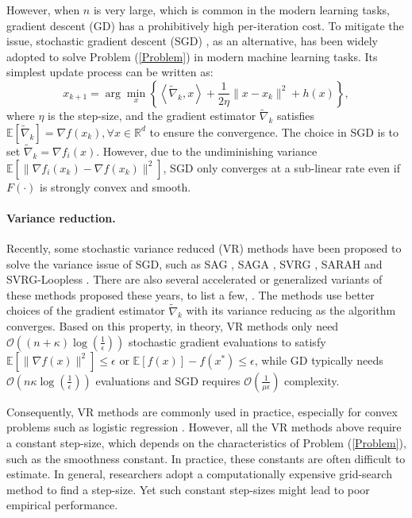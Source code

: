 \documentclass[letterpaper]{article} %
\begin{document}
However, when $n$ is very large, which is common in the modern learning tasks, gradient descent (GD) has a prohibitively high per-iteration cost.
%
%
To mitigate the issue, stochastic gradient descent (SGD) \citep{10.1214/aoms/1177729586, DBLP:journals/siamjo/NemirovskiJLS09}, as an alternative, has been widely adopted to solve Problem (\ref{Problem}) in modern machine learning tasks.
%
Its simplest update process can be written as:
\begin{equation*}
    x_{k+1} = \arg \min_x \left\{\left\langle \widetilde{\nabla}_k, x \right\rangle  + \frac{1}{2\eta}\|x-x_k\|^2+ h(x)\right\},
\end{equation*}
where $\eta$ is the step-size, and the gradient estimator $\widetilde{\nabla}_k$ satisfies $\mathbb{E}[\widetilde{\nabla}_k] = \nabla f(x_k), \forall x \in \mathbb{R}^d$ to ensure the convergence.
%
The choice in SGD is to set $\widetilde{\nabla}_k=\nabla f_i(x)$.
%
However, due to the undiminishing variance $\mathbb{E}[\|\nabla f_i(x_k) - \nabla f(x_k) \|^2]$, SGD only converges at a sub-linear rate even if $F(\cdot)$ is strongly convex and smooth.

\paragraph{Variance reduction.}
%
Recently, some stochastic variance reduced (VR) methods have been proposed to solve the variance issue of SGD, such as SAG \citep{DBLP:conf/nips/RouxSB12}, SAGA \citep{DBLP:conf/nips/DefazioBL14}, SVRG \citep{DBLP:conf/nips/Johnson013}, SARAH \citep{DBLP:conf/icml/NguyenLST17} and SVRG-Loopless \citep{DBLP:conf/alt/KovalevHR20}.
%
There are also several accelerated or generalized variants of these methods proposed these years, to list a few, \cite{DBLP:conf/nips/Defazio16,DBLP:journals/mp/GowerRB21,DBLP:journals/corr/abs-2006-11573,DBLP:conf/nips/ZhouSC20}.
%
The methods use better choices of the gradient estimator $\widetilde{\nabla}_k$ with its variance reducing as the algorithm converges.
%
Based on this property, in theory, VR methods only need $\mathcal{O}((n+\kappa)\log(\frac{1}{\epsilon}))$ stochastic gradient evaluations to satisfy $\mathbb{E}[\|\nabla f(x) \|^2] \leq \epsilon$ or $\mathbb{E}[f(x)] - f(x^*) \leq \epsilon$, while GD typically needs $\mathcal{O}(n\kappa \log(\frac{1}{\epsilon}))$ evaluations and SGD requires $\mathcal{O}(\frac{1}{\mu\epsilon})$ complexity.
%

Consequently, VR methods are commonly used in practice, especially for convex problems such as logistic regression \citep{DBLP:journals/corr/abs-2102-09645}.
%
However, all the VR methods above require a constant step-size, which depends on the characteristics of Problem (\ref{Problem}), such as the smoothness constant.
%
In practice, these constants are often difficult to estimate.
%
In general, researchers adopt a computationally expensive grid-search method to find a step-size.
%
Yet such constant step-sizes might lead to poor empirical performance.
\end{document}

